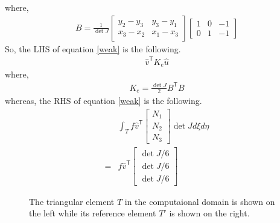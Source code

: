 \documentclass{article}
\begin{document}
where,
\begin{align*}
	B = \frac{1}{\det J} 
	\begin{bmatrix} y_2 - y_3 & y_3 - y_1 \\ x_3 - x_2 & x_1 - x_3 \end{bmatrix}
	\begin{bmatrix} 1 & 0 & -1 \\ 0 & 1 & -1 \end{bmatrix}
\end{align*}
So, the LHS of equation \ref{weak} is the following.
\begin{align*}
	\hat{v}^{\mathsf{T}} K_e \hat{u}
\end{align*}
where,
\begin{align*}
	K_e = \frac{\det J}{2} B^{\mathsf{T}}B
\end{align*}
whereas, the RHS of equation \ref{weak} is the following.
\begin{align*}
	& \int_T f \hat{v}^{\mathsf{T}} \begin{bmatrix} N_1 \\ N_2 \\ N_3 \end{bmatrix} \det J d\xi d\eta \\
		= & f \hat{v}^{\mathsf{T}} \begin{bmatrix} \det J / 6 \\ \det J / 6 \\ \det J / 6 \end{bmatrix}
\end{align*}

\begin{figure}
\centering
{}
\caption{
  The triangular element $T$ in the computaional domain
  is shown on the left
  while its reference element $T'$ 
  is shown on the right.
  }
\label{elems}
\end{figure}
\end{document}
